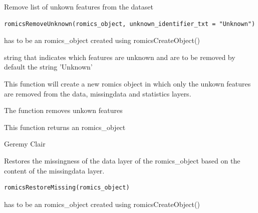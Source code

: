 \documentclass[a4paper]{book}
\begin{document}
%
\begin{Description}
Remove list of unkown features from the dataset
\end{Description}
%
\begin{Usage}
\begin{verbatim}
romicsRemoveUnknown(romics_object, unknown_identifier_txt = "Unknown")
\end{verbatim}
\end{Usage}
%
\begin{Arguments}
\begin{ldescription}
\item[\code{romics\_object}] has to be an romics\_object created using romicsCreateObject()

\item[\code{unknown\_identifier\_txt}] string that indicates which features are unknown and are to be removed by default the string 'Unknown'
\end{ldescription}
\end{Arguments}
%
\begin{Details}
This function will create a new romics object in which only the unkown features are removed from the data, missingdata and statistics layers.

The function removes unkown features
\end{Details}
%
\begin{Value}
This function returns an romics\_object
\end{Value}
%
\begin{Author}
Geremy Clair
\end{Author}
%
\begin{Description}
Restores the missingness of the data layer of the romics\_object based on the content of the missingdata layer.
\end{Description}
%
\begin{Usage}
\begin{verbatim}
romicsRestoreMissing(romics_object)
\end{verbatim}
\end{Usage}
%
\begin{Arguments}
\begin{ldescription}
\item[\code{romics\_object}] has to be an romics\_object created using romicsCreateObject()
\end{ldescription}
\end{Arguments}
\end{document}
